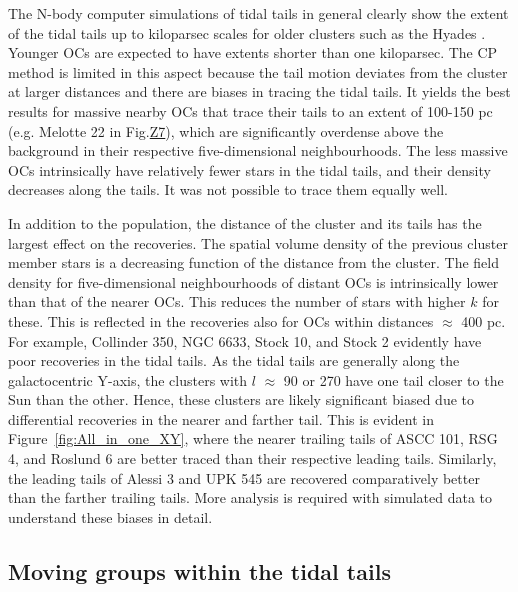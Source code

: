 \documentclass{aa}
\begin{document}
The N-body computer simulations of tidal tails in general clearly show the extent of the tidal tails up to kiloparsec scales for older clusters such as the Hyades \citep[e.g.][]{2020A&A...640A..84Dinnbier,2021A&A...647A.137Jerabkova,2023A&A...671A..88Pflamm-Altenburg}. Younger OCs are expected to have extents shorter than one kiloparsec. The CP method is limited in this aspect because the tail motion deviates from the cluster at larger distances and there are biases in tracing the tidal tails. It yields the best results for massive nearby OCs that trace their tails to an extent of 100-150 pc (e.g. Melotte 22 in Fig.\href{https://doi.org/10.5281/zenodo.14651597}{Z7}), which are significantly overdense above the background in their respective five-dimensional neighbourhoods. The less massive OCs intrinsically have relatively fewer stars in the tidal tails, and their density decreases along the tails. It was not possible to trace them equally well.


In addition to the population, the distance of the cluster and its tails has the largest effect on the recoveries. The spatial volume density of the previous cluster member stars is a decreasing function of the distance from the cluster. The field density for five-dimensional neighbourhoods of distant OCs is intrinsically lower than that of the nearer OCs. This reduces the number of stars with higher $k$ for these. This is reflected in the recoveries also for OCs within distances $\approx$ 400 pc. For example, Collinder 350, NGC 6633, Stock 10, and Stock 2 evidently have poor recoveries in the tidal tails. As the tidal tails are generally along the galactocentric Y-axis, the clusters with $l$ $\approx$
90 or 270 have one tail closer to the Sun than the other. Hence, these clusters are likely significant biased due to differential recoveries in the nearer and farther tail. This is evident in Figure~\ref{fig:All_in_one_XY}, where the nearer trailing tails of ASCC 101, RSG 4, and Roslund 6 are better traced than their respective leading tails. Similarly, the leading tails of Alessi 3 and UPK 545 are recovered comparatively better than the farther trailing tails. More analysis is required with simulated data to understand these biases in detail. %

\subsection{Moving groups within the tidal tails}\label{sec: Moving Groups}
\end{document}
